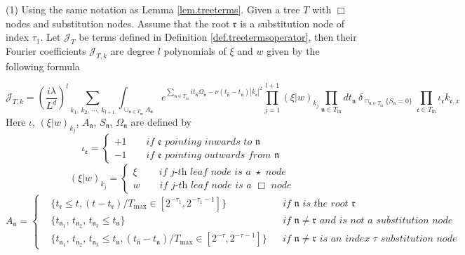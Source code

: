 \begin{lem}\label{lem.treetermsoperator} (1) Using the same notation as Lemma \ref{lem.treeterms}. Given a tree $T$ with $\Box$ nodes and substitution nodes. Assume that the root $\mathfrak{r}$ is a substitution node of index $\tau_{1}$. Let $\mathcal{J}_T$ be terms defined in Definition \ref{def.treetermsoperator}, then their Fourier coefficients $\mathcal{J}_{T,k}$ are degree $l$ polynomials of $\xi$ and $w$ given by the following formula

\begin{equation}\label{eq.coeftermoperator.threewave}
\mathcal{J}_{T,k}=\left(\frac{i\lambda}{L^{d}}\right)^l\sum_{k_1,\, k_2,\, \cdots,\, k_{l+1}} \int_{\cup_{\mathfrak{n}\in T_{\text{in}}} A_{\mathfrak{n}}} e^{\sum_{\mathfrak{n}\in T_{\text{in}}} it_{\mathfrak{n}}\Omega_{\mathfrak{n}}-\nu(t_{\widehat{\mathfrak{n}}}-t_{\mathfrak{n}})|k_{\mathfrak{e}}|^2} \prod_{j=1}^{l+1} (\xi|w)_{k_j} %
\prod_{\mathfrak{n}\in T_{\text{in}}} dt_{\mathfrak{n}} 
\ \delta_{\cap_{\mathfrak{n}\in T_{\text{in}}} \{S_{\mathfrak{n}}=0\}}\ \prod_{\mathfrak{e}\in T_{\text{in}}}\iota_{\mathfrak{e}}k_{\mathfrak{e},x}
\end{equation}
Here $\iota$, $(\xi|w)_{k_j}$, $A_{\mathfrak{n}}$, $S_{\mathfrak{n}}$, $\Omega_{\mathfrak{n}}$ are defined by 
\begin{equation}
    \iota_{\mathfrak{e}}=\begin{cases}
        +1 \qquad \textit{if $\mathfrak{e}$ pointing inwards to $\mathfrak{n}$}
        \\
        -1 \qquad  \textit{if $\mathfrak{e}$ pointing outwards from $\mathfrak{n}$}
    \end{cases}
\end{equation}
\begin{equation}
    (\xi|w)_{k_j}=\begin{cases}
        \xi \qquad\  \textit{if $j$-th leaf node is a $\star$ node}
        \\
        w \qquad  \textit{if $j$-th leaf node is a $\Box$ node}
    \end{cases}
\end{equation}
\begin{equation}
    A_{\mathfrak{n}}=\left\{
    \begin{aligned}
        &\{t_{\mathfrak{r}}\le t, (t-t_{\mathfrak{r}})/T_{\text{max}}\in [2^{-\tau_{1}},2^{-\tau_{1}-1}]\} && \textit{if $\mathfrak{n}$ is the root $\mathfrak{r}$ }
        \\
        &\{t_{\mathfrak{n}_1},\, t_{\mathfrak{n}_2},\, t_{\mathfrak{n}_3}\le t_{\mathfrak{n}}\} && \textit{if $\mathfrak{n}\ne \mathfrak{r}$ and is not a substitution node}
        \\
        &\{t_{\mathfrak{n}_1},\, t_{\mathfrak{n}_2},\, t_{\mathfrak{n}_3}\le t_{\mathfrak{n}}, (t_{\widehat{\mathfrak{n}}}-t_{\mathfrak{n}})/T_{\text{max}}\in [2^{-\tau},2^{-\tau-1}]\}  &&\textit{if $\mathfrak{n}\ne \mathfrak{r}$ is an index $\tau$ substitution node}
    \end{aligned}\right.
\end{equation}


\end{lem}
